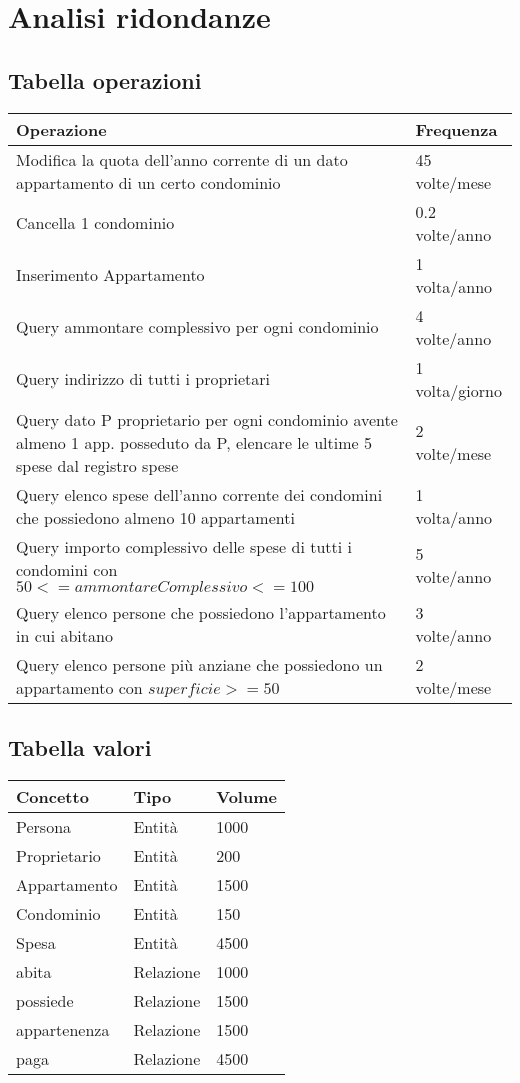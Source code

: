 \section{Analisi ridondanze}
\label{ridondanze}

\subsection{Tabella operazioni}

\begin{tabular}{|p{320pt}|l|}
	\hline
	\textbf{Operazione} & \textbf{Frequenza} \\ \hline
	Modifica la quota dell'anno corrente di un dato appartamento di un certo condominio & 45 volte/mese \\ \hline
	Cancella 1 condominio & 0.2 volte/anno \\ \hline
	Inserimento Appartamento & 1 volta/anno \\ \hline
	Query ammontare complessivo per ogni condominio & 4 volte/anno \\ \hline
	Query indirizzo di tutti i proprietari & 1 volta/giorno \\ \hline
	Query dato P proprietario per ogni condominio avente almeno 1 app. posseduto da P, elencare le ultime 5 spese dal registro spese & 2 volte/mese \\ \hline
	Query elenco spese dell'anno corrente dei condomini che possiedono almeno 10 appartamenti & 1 volta/anno \\ \hline
	Query importo complessivo delle spese di tutti i condomini con $50 <= ammontareComplessivo <= 100$ & 5 volte/anno \\ \hline
	Query elenco persone che possiedono l'appartamento in cui abitano & 3 volte/anno \\ \hline
	Query elenco persone più anziane che possiedono un appartamento con $superficie >= 50$ & 2 volte/mese \\ \hline
\end{tabular}

\subsection{Tabella valori}

\begin{tabular}{|l|l|l|}
	\hline
	Concetto & Tipo & Volume \\ \hline
	Persona & Entità & 1000 \\ \hline
	Proprietario & Entità & 200 \\ \hline
	Appartamento & Entità & 1500 \\ \hline
	Condominio & Entità & 150 \\ \hline
	Spesa & Entità & 4500 \\ \hline
	abita & Relazione & 1000 \\ \hline
	possiede & Relazione & 1500 \\ \hline
	appartenenza & Relazione & 1500 \\ \hline
	paga & Relazione & 4500 \\ \hline
\end{tabular}

